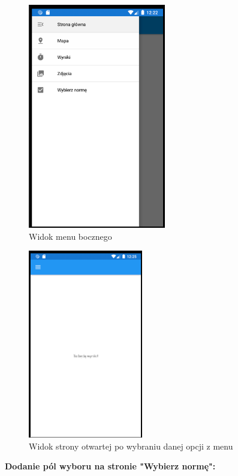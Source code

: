 \begin{figure}[!htb]
	\begin{center}
		\includegraphics[width=6cm]{rys/ZSmenu.png}
		\caption{Widok menu bocznego}
		\label{rys:rysunek008}
	\end{center}
\end{figure}
\newline \newline
\begin{figure}[!htb]
	\begin{center}
		\includegraphics[width=5cm]{rys/ZSotwartastrona.png}
		\caption{Widok strony otwartej po wybraniu danej opcji z menu}
		\label{rys:rysunek009}
	\end{center}
\end{figure}
 \newline
 \textbf{Dodanie pól wyboru na stronie "Wybierz normę":} \newline
